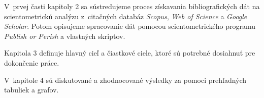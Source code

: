 V~prvej časti kapitoly 2 sa sústreďujeme  proces získavania bibliografických
dát na scientometrickú analýzu z~citačných databáz \emph{Scopus}, \emph{Web of
Science} a \emph{Google Scholar}.  Potom opisujeme spracovanie dát pomocou
scientometrického programu \emph{Publish or Perish} a vlastných skriptov.

Kapitola 3 definuje hlavný cieľ a čiastkové ciele, ktoré sú potrebné dosiahnuť
pre dokončenie práce.

V~kapitole 4 sú diskutované a zhodnocované  výsledky za pomoci prehľadných
tabuliek a grafov.

